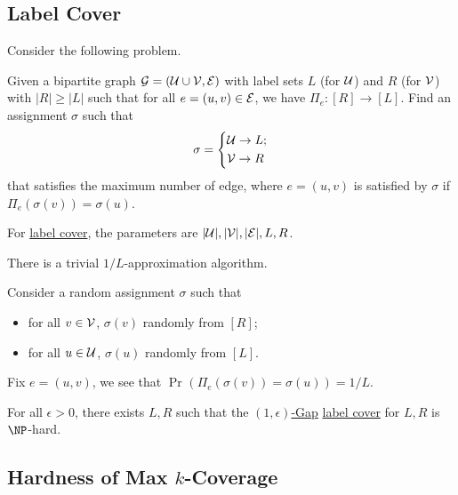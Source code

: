 \subsection{Label Cover}
Consider the following problem.

\begin{problem}\label{prb:label-cover}
Given a bipartite graph \(\mathcal{\MakeUppercase{g}} =(\mathcal{\MakeUppercase{u}} \cup \mathcal{\MakeUppercase{v}} , \mathcal{\MakeUppercase{e}} )\) with label sets \(L\) (for \(\mathcal{\MakeUppercase{u}} \)) and \(R\) (for \(\mathcal{\MakeUppercase{v}} \)) with \(\vert R \vert \geq \vert L \vert \) such that for all \(e=(u, v)\in \mathcal{\MakeUppercase{e}} \), we have \(\Pi _e \colon [R]\to [L]\). Find an assignment \(\sigma \) such that
\[
	\sigma = \begin{dcases}
		\mathcal{\MakeUppercase{u}} \to L; \\
		\mathcal{\MakeUppercase{v}} \to R
	\end{dcases}
\]
that satisfies the maximum number of edge, where \(e=(u, v)\) is satisfied by \(\sigma \) if \(\Pi _e(\sigma (v)) = \sigma (u)\).
\end{problem}

For \hyperref[prb:label-cover]{label cover}, the parameters are \(\vert \mathcal{\MakeUppercase{u}}  \vert, \vert \mathcal{\MakeUppercase{v}}  \vert , \vert \mathcal{\MakeUppercase{e}}  \vert , L, R\).

\begin{remark}[Baseline]
	There is a trivial \(1/L\)-approximation algorithm.
\end{remark}
\begin{explanation}
	Consider a random assignment \(\sigma \) such that
	\begin{itemize}
		\item for all \(v\in \mathcal{\MakeUppercase{v}} \), \(\sigma (v)\) randomly from \([R]\);
		\item for all \(u\in \mathcal{\MakeUppercase{u}} \), \(\sigma (u)\) randomly from \([L]\).
	\end{itemize}
	Fix \(e=(u, v)\), we see that \(\Pr_{}(\Pi _e(\sigma (v)) = \sigma (u)) = 1 / L \).
\end{explanation}

\begin{theorem}
	For all \(\epsilon > 0\), there exists \(L, R\) such that the \hyperref[def:c-s-Gap]{\((1, \epsilon )\)-Gap} \hyperref[prb:label-cover]{label cover} for \(L, R\) is \(\NP\)-hard.
\end{theorem}

\subsection{Hardness of Max \(k\)-Coverage}


